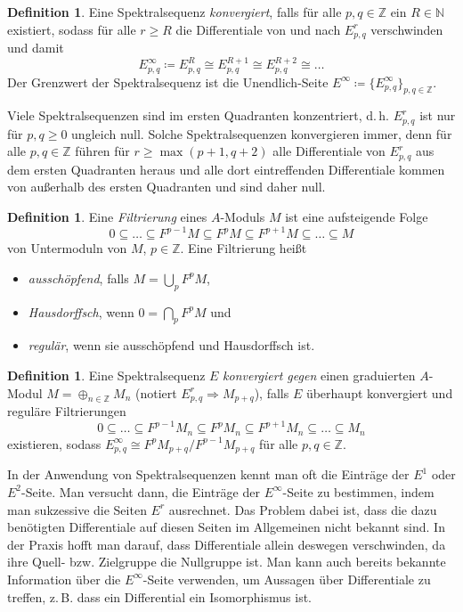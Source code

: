 \documentclass[11pt, a4paper, german]{article}
\theoremstyle{definition}
\newtheorem{defn}[lem]{Definition}
\theoremstyle{remark}
\newcommand{\N}{\mathbb{N}} %
\newcommand{\Z}{\mathbb{Z}} %
\renewcommand{\dh}{d.\,h.} %
\begin{document}
\begin{defn}
  Eine Spektralsequenz \emph{konvergiert}, falls für alle $p, q \in \Z$ ein $R \in \N$ existiert, sodass für alle $r \geq R$ die Differentiale von und nach $E^r_{p,q}$ verschwinden und damit
  \[ E^\infty_{p,q} \coloneqq E^R_{p,q} \cong E^{R+1}_{p,q} \cong E^{R+2}_{p,q} \cong \ldots \]
  Der Grenzwert der Spektralsequenz ist die Unendlich-Seite $E^\infty \coloneqq \{ E^\infty_{p,q} \}_{p,q \in \Z}$.
\end{defn}

Viele Spektralsequenzen sind im ersten Quadranten konzentriert, \dh{} $E^r_{p,q}$ ist nur für $p, q \geq 0$ ungleich null.
Solche Spektralsequenzen konvergieren immer, denn für alle $p, q \in \Z$ führen für $r \geq \max(p+1, q+2)$ alle Differentiale von $E^r_{p,q}$ aus dem ersten Quadranten heraus und alle dort eintreffenden Differentiale kommen von außerhalb des ersten Quadranten und sind daher null.

\begin{defn}
  Eine \emph{Filtrierung} eines $A$-Moduls $M$ ist eine aufsteigende Folge
  \[ 0 \subseteq \ldots \subseteq F^{p-1} M \subseteq F^p M \subseteq F^{p+1} M \subseteq \ldots \subseteq M \]
  von Untermoduln von $M$, $p \!\in\! \Z$.
  Eine Filtrierung heißt
  \begin{itemize}
    \item \emph{ausschöpfend}, falls $M = \bigcup_p F^p M$,
    \item \emph{Hausdorffsch}, wenn $0 = \bigcap_p F^p M$ und
    \item \emph{regulär}, wenn sie ausschöpfend und Hausdorffsch ist.
  \end{itemize}
\end{defn}

\begin{defn}
  Eine Spektralsequenz $E$ \emph{konvergiert gegen} einen graduierten $A$-Modul $M = \oplus_{n \in \Z} M_n$ (notiert $E^r_{p,q} \Rightarrow M_{p+q}$), falls $E$ überhaupt konvergiert und reguläre Filtrierungen
  \[ 0 \subseteq \ldots \subseteq F^{p-1} M_n \subseteq F^p M_n \subseteq F^{p+1} M_n \subseteq \ldots \subseteq M_n \]
  existieren, sodass $E^\infty_{p,q} \cong F^p M_{p+q} / F^{p-1} M_{p+q}$ für alle $p, q \in \Z$.
\end{defn}

In der Anwendung von Spektralsequenzen kennt man oft die Einträge der $E^1$ oder $E^2$-Seite.
Man versucht dann, die Einträge der $E^\infty$-Seite zu bestimmen, indem man sukzessive die Seiten $E^r$ ausrechnet.
Das Problem dabei ist, dass die dazu benötigten Differentiale auf diesen Seiten im Allgemeinen nicht bekannt sind.
In der Praxis hofft man darauf, dass Differentiale allein deswegen verschwinden, da ihre Quell- bzw. Zielgruppe die Nullgruppe ist.
Man kann auch bereits bekannte Information über die $E^\infty$-Seite verwenden, um Aussagen über Differentiale zu treffen, z.\,B. dass ein Differential ein Isomorphismus ist.
\end{document}
